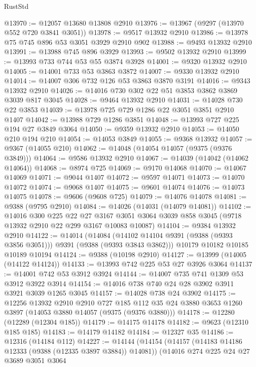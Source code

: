 \begin{lexlean}{RustStd}
\begin{coremodule}
@13970 := @12057 @13680 @13808 @2910
@13976 := @13967 (@9297 (@13970 @552 @720 @3841 @3051))
@13978 := @9517 @13932 @2910
@13986 := @13978 @75 @745 @896 @53 @3051 @3929 @2910 @902
@13988 := @9493 @13932 @2910
@13991 := @13988 @745 @896 @3929
@13993 := @9502 @13932 @2910
@13999 := @13993 @733 @744 @53 @55 @3874 @3928
@14001 := @9320 @13932 @2910
@14005 := @14001 @733 @53 @3863 @3872
@14007 := @9330 @13932 @2910
@14014 := @14007 @306 @732 @126 @53 @3863 @3870 @3191
@14016 := @9343 @13932 @2910
@14026 := @14016 @730 @302 @22 @51 @3853 @3862 @3869 @3039 @817 @3045
@14028 := @9464 @13932 @2910
@14031 := @14028 @730 @22 @3853
@14039 := @13978 @725 @729 @1286 @22 @3051 @3851 @2910 @1407
@14042 := @13988 @729 @1286 @3851
@14048 := @13993 @727 @225 @194 @27 @3849 @3064
@14050 := @9359 @13932 @2910
@14053 := @14050 @210 @194 @210
@14054 := @14053 @3849
@14055 := @9368 @13932
@14057 := @9367 (@14055 @210)
@14062 := @14048 (@14054 @14057 (@9375 (@9376 @3849)))
@14064 := @9586 @13932 @2910
@14067 := @14039 (@14042 (@14062 @14064))
@14068 := @8974 @725
@14069 := @9170 @14068
@14070 := @14067 @14069
@14071 := @9044 @1407
@14072 := @9597 @14071
@14073 := @14070 @14072
@14074 := @9068 @1407
@14075 := @9601 @14074
@14076 := @14073 @14075
@14078 := @9606 (@9608 @725)
@14079 := @14076 @14078
@14081 := @9388 (@9795 @2910)
@14084 := @14026 (@14031 (@14079 @14081))
@14102 := @14016
    @300
    @225
    @22
    @27
    @3167
    @3051
    @3064
    @3039
    @858
    @3045
    (@9718 @13932 @2910 @22 @299 @3167 @10083 @10087)
@14104 := @9384 @13932 @2910
@14122 := @14014
    (@14084 (@14102 @14104 @9391 (@9388 (@9393 @3856 @3051))) @9391 (@9388 (@9393 @3843 @3862)))
    @10179
    @10182
    @10185
    @10189
    @10194
@14124 := @9388 (@10198 @2910)
@14127 := @13999 (@14005 (@14122 @14124))
@14133 := @13993 @742 @225 @53 @27 @3926 @3064
@14137 := @14001 @742 @53 @3912 @3924
@14144 := @14007 @735 @741 @1309 @53 @3912 @3922 @3914
@14154 := @14016 @738 @740 @24 @28 @3902 @3911 @3921 @3039 @1265 @3045
@14157 := @14028 @738 @24 @3902
@14175 := @12256
    @13932
    @2910
    @2910
    @727
    @185
    @112
    @35
    @24
    @3880
    @3653
    @1260
    @3897
    (@14053 @3880 @14057 (@9375 (@9376 @3880)))
@14178 := @12280 (@12289 (@12304 @185))
@14179 := @14175 @14178
@14182 := @9623 (@12310 @185 @185)
@14183 := @14179 @14182
@14184 := @12327 @35
@14186 := @12316 (@14184 @112)
@14227 := @14144
    (@14154
      (@14157 (@14183 @14186 @12333 (@9388 (@12335 @3897 @3884)) @14081))
      (@14016
        @274
        @225
        @24
        @27
        @3689
        @3051
        @3064

\end{coremodule}
\end{lexlean}
